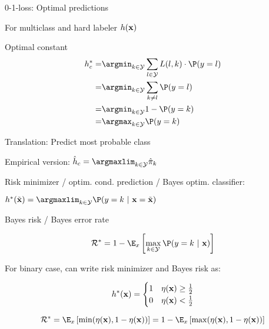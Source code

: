 \documentclass[11pt,compress,t,notes=noshow, xcolor=table]{beamer}
\begin{document}
\begin{framei}[sep=M]{0-1-loss: Optimal predictions}

\item For multiclass and hard labeler $h(\mathbf{x})$
\item Optimal constant
\begin{align*}   h_{c}^{\ast}  =& \argmin_{k \in \Yspace} \sum_{l \in \Yspace} L(l, k) \cdot \P(y = l) \\
=& \argmin_{k \in \Yspace} \sum_{k \ne l} \P(y = l) \\ 
=& \argmin_{k \in \Yspace} 1 - \P(y = k) \\
=& \argmax_{k \in \Yspace} \P(y = k)
  \end{align*}


\item Translation: Predict most probable class

\item Empirical version: $\hat{h}_c = \argmaxlim_{k \in \Yspace} \pikh$

\item Risk minimizer / optim. cond. prediction / Bayes optim. classifier:

 $h^{\ast}(\xtil) = \argmaxlim_{k \in \Yspace} \P(y = k~|~ \xv = \xtil)$ 

\end{framei}


\begin{frame}{Bayes risk  / Bayes error rate}

$$
  \riskbayes = 1 - \E_{x} \left[\max_{k \in \Yspace} \P(y = k~|~ \xv)\right]
$$

\vfill

For binary case, can write risk minimizer and Bayes risk as:  

$$
  h^{\ast}(\mathbf{x}) = \begin{cases} 1 & \eta(\mathbf{x}) \ge \frac{1}{2} \\ 0 & \eta(\mathbf{x}) < \frac{1}{2}\end{cases} 
$$

$$
\riskbayes = \E_x\left[\min(\eta(\xv), 1 - \eta(\xv))\right] = 1 - \E_x\left[\max(\eta(\xv), 1 - \eta(\xv))\right] 
$$

 
\end{frame}
\end{document}
